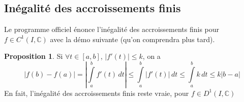 \documentclass[10pt,a4paper]{article}
\theoremstyle{definition}
\newtheorem{proposition}{Proposition}[section]
\begin{document}
\subsection{Inégalité des accroissements finis}
Le programme officiel énonce l'inégalité des accroissements finis pour $f \in C^1(I, \mathbb{C})$ avec la démo suivante (qu'on comprendra plus tard).
\begin{proposition}
Si $\forall t \in [a, b]$, $|f'(t)| \leq k$, on a
\[|f(b) - f(a)| = \left| \int\limits_a^b f'(t) \, dt \right| \leq \int\limits_a^b \left|f'(t)\right| \, dt \leq \int\limits_a^b k \, dt \leq k |b - a|\]
En fait, l'inégalité des accroissements finis reste vraie, pour $f \in D^1(I, \mathbb{C})$
\end{proposition}
\end{document}

